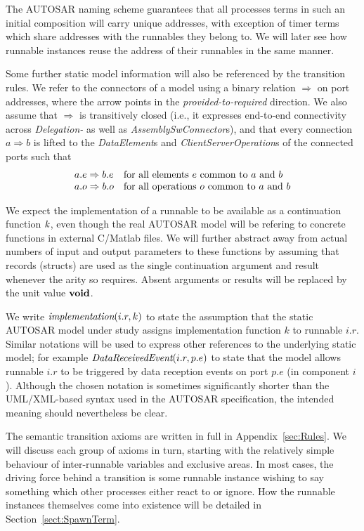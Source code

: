 \documentclass[twocolumn]{article}
\begin{document}
The AUTOSAR naming scheme guarantees that all processes terms in such an initial composition will carry unique addresses, with exception of timer terms which share addresses with the runnables they belong to. We will later see how runnable instances reuse the address of their runnables in the same manner.

Some further static model information will also be referenced by the transition rules. We refer to the connectors of a model using a binary relation $\Rightarrow$ on port addresses, where the arrow points in the \emph{provided-to-required} direction. We also assume that $\Rightarrow$ is transitively closed (i.e., it expresses end-to-end connectivity across \emph{Delegation-} as well as \emph{AssemblySwConnector}s), and that every connection $a \Rightarrow b$ is lifted to the \emph{DataElement}s and \emph{ClientServerOperation}s of the connected ports such that
\[
\begin{array}{lll}
  a.e \Rightarrow b.e & \text{for all elements $e$ common to $a$ and $b$} \\
  a.o \Rightarrow b.o & \text{for all operations $o$ common to $a$ and $b$} \\
\end{array}
\]

We expect the implementation of a runnable to be available as a continuation function $\Cont$, even though the real AUTOSAR model will be refering to concrete functions in external C/Matlab files. We will further abstract away from actual numbers of input and output parameters to these functions by assuming that records (structs) are used as the single continuation argument and result whenever the arity so requires. Absent arguments or results will be replaced by the unit value $\textbf{void}$.

We write $\emph{implementation}(i.r,k)$ to state the assumption that the static AUTOSAR model under study assigns implementation function $k$ to runnable $i.r$. Similar notations will be used to express other references to the underlying static model; for example $\emph{DataReceivedEvent}(i.r,p.e)$ to state that the model allows runnable $i.r$ to be triggered by data reception events on port $p.e$ (in component $i$). Although the chosen notation is sometimes significantly shorter than the UML/XML-based syntax used in the AUTOSAR specification, the intended meaning should nevertheless be clear.

The semantic transition axioms are written in full in Appendix~\ref{sec:Rules}. We will discuss each group of axioms in turn, starting with the relatively simple behaviour of inter-runnable variables and exclusive areas. In most cases, the driving force behind a transition is some runnable instance wishing to say something which other processes either react to or ignore. How the runnable instances themselves come into existence will be detailed in Section~\ref{sect:SpawnTerm}.
\end{document}
